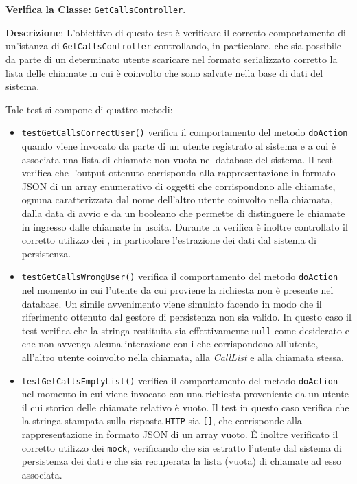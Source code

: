 \begin{itemize}
\textbf{Verifica la Classe:} \texttt{GetCallsController}.

\textbf{Descrizione}: L'obiettivo di questo test è verificare il corretto comportamento di un'istanza di \texttt{GetCallsController} controllando, in particolare, che sia possibile da parte di un determinato utente scaricare nel formato serializzato corretto la lista delle chiamate in cui è coinvolto che sono salvate nella base di dati del sistema.

Tale test si compone di quattro metodi:
\begin{itemize}
\item \texttt{testGetCallsCorrectUser()} verifica il comportamento del metodo \texttt{doAction} quando viene invocato da parte di un utente registrato al sistema e a cui è associata una lista di chiamate non vuota nel database del sistema. Il test verifica che l'output ottenuto corrisponda alla rappresentazione in formato JSON di un array enumerativo di oggetti che corrispondono alle chiamate, ognuna caratterizzata dal nome dell'altro utente coinvolto nella chiamata, dalla data di avvio e da un  booleano che permette di distinguere le chiamate in ingresso dalle chiamate in uscita. Durante la verifica è inoltre controllato il corretto utilizzo dei , in particolare l'estrazione dei dati dal sistema di persistenza.

\item \texttt{testGetCallsWrongUser()} verifica il comportamento del metodo \texttt{doAction} nel momento in cui l'utente da cui proviene la richiesta non è presente nel database. Un simile avvenimento viene simulato facendo in modo che il riferimento ottenuto dal gestore di persistenza non sia valido. In questo caso il test verifica che la stringa restituita sia effettivamente \texttt{null} come desiderato e che non avvenga alcuna interazione con i  che corrispondono all'utente, all'altro utente coinvolto nella chiamata, alla \textit{CallList} e alla chiamata stessa.

\item \texttt{testGetCallsEmptyList()} verifica il comportamento del metodo \texttt{doAction} nel momento in cui viene invocato con una richiesta proveniente da un utente il cui storico delle chiamate relativo è vuoto. Il test in questo caso verifica che la stringa stampata sulla risposta \texttt{HTTP} sia \texttt{[]}, che corrisponde alla rappresentazione in formato JSON di un array vuoto. È inoltre verificato il corretto utilizzo dei \texttt{mock}, verificando che sia estratto l'utente dal sistema di persistenza dei dati e che sia recuperata la lista (vuota) di chiamate ad esso associata.


\end{itemize}
\end{itemize}
